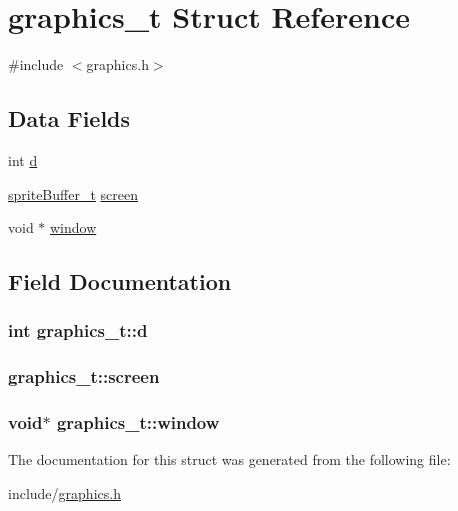 \hypertarget{structgraphics__t}{}\section{graphics\+\_\+t Struct Reference}
\label{structgraphics__t}


{\ttfamily \#include $<$graphics.\+h$>$}

\subsection*{Data Fields}
\begin{DoxyCompactItemize}
\item 
int \hyperlink{structgraphics__t_ad199c9ece35a3a64263ee6b64749bb5b}{d}
\item 
\hyperlink{structsprite_buffer__t}{sprite\+Buffer\+\_\+t} \hyperlink{structgraphics__t_a165959217e2643b80a710eee4212f563}{screen}
\item 
void $\ast$ \hyperlink{structgraphics__t_a2481cd19286678d56f33570ae34e406f}{window}
\end{DoxyCompactItemize}


\subsection{Field Documentation}
\subsubsection[{\texorpdfstring{d}{d}}]{\setlength{\rightskip}{0pt plus 5cm}int graphics\+\_\+t\+::d}\hypertarget{structgraphics__t_ad199c9ece35a3a64263ee6b64749bb5b}{}\label{structgraphics__t_ad199c9ece35a3a64263ee6b64749bb5b}
\subsubsection[{\texorpdfstring{screen}{screen}}]{ graphics\+\_\+t\+::screen}\hypertarget{structgraphics__t_a165959217e2643b80a710eee4212f563}{}\label{structgraphics__t_a165959217e2643b80a710eee4212f563}
\subsubsection[{\texorpdfstring{window}{window}}]{\setlength{\rightskip}{0pt plus 5cm}void$\ast$ graphics\+\_\+t\+::window}\hypertarget{structgraphics__t_a2481cd19286678d56f33570ae34e406f}{}\label{structgraphics__t_a2481cd19286678d56f33570ae34e406f}


The documentation for this struct was generated from the following file\+:\begin{DoxyCompactItemize}
\item 
include/\hyperlink{graphics_8h}{graphics.\+h}\end{DoxyCompactItemize}
